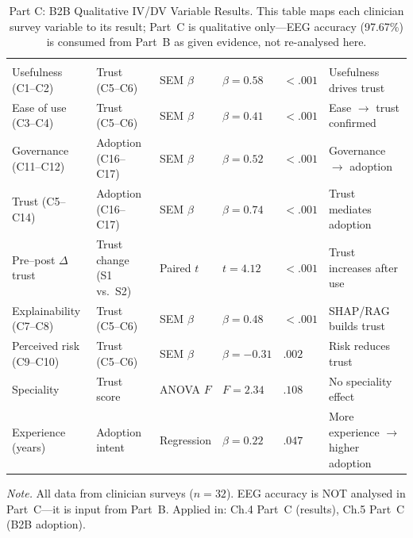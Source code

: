 {\tablestripes\tablefontsize
\begin{xltabular}{\textwidth}{@{} >{\raggedright\arraybackslash}p{2.5cm} >{\raggedright\arraybackslash}p{2.5cm} >{\raggedright\arraybackslash}p{1.8cm} >{\centering\arraybackslash}p{1.5cm} >{\centering\arraybackslash}p{1.2cm} L @{}}
\caption[Part C: B2B Qualitative IV/DV Variable Results]{Part C: B2B Qualitative IV/DV Variable Results. This table maps each clinician survey variable to its result; Part~C is qualitative only---EEG accuracy (97.67\%) is consumed from Part~B as given evidence, not re-analysed here.}\label{tab:ch4_partc_ivdv_results} \\
\toprule
{} &  &  &  &  &  \\
\midrule
\endfirsthead
\toprule
{} &  &  &  &  &  \\
\midrule
\endhead
\bottomrule
\endlastfoot
Usefulness (C1--C2) & Trust (C5--C6) & SEM $\beta$ & $\beta = 0.58$ & $< .001$ & Usefulness drives trust \\
\addlinespace
Ease of use (C3--C4) & Trust (C5--C6) & SEM $\beta$ & $\beta = 0.41$ & $< .001$ & Ease $\to$ trust confirmed \\
\addlinespace
Governance (C11--C12) & Adoption (C16--C17) & SEM $\beta$ & $\beta = 0.52$ & $< .001$ & Governance $\to$ adoption \\
\addlinespace
Trust (C5--C14) & Adoption (C16--C17) & SEM $\beta$ & $\beta = 0.74$ & $< .001$ & Trust mediates adoption \\
\addlinespace
Pre--post $\Delta$ trust & Trust change (S1 vs.\ S2) & Paired $t$ & $t = 4.12$ & $< .001$ & Trust increases after use \\
\addlinespace
Explainability (C7--C8) & Trust (C5--C6) & SEM $\beta$ & $\beta = 0.48$ & $< .001$ & SHAP/RAG builds trust \\
\addlinespace
Perceived risk (C9--C10) & Trust (C5--C6) & SEM $\beta$ & $\beta = -0.31$ & $.002$ & Risk reduces trust \\
\addlinespace
Speciality & Trust score & ANOVA $F$ & $F = 2.34$ & $.108$ & No speciality effect \\
\addlinespace
Experience (years) & Adoption intent & Regression & $\beta = 0.22$ & $.047$ & More experience $\to$ higher adoption \\
\end{xltabular}}
\vspace{2pt}
\noindent\textit{Note.} All data from clinician surveys ($n = 32$). EEG accuracy is NOT analysed in Part~C---it is input from Part~B. Applied in: Ch.4 Part~C (results), Ch.5 Part~C (B2B adoption).

